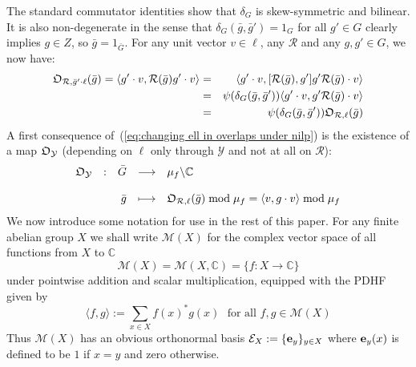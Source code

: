 \documentclass[12pt]{article}
\newcommand{\addwords}[1]{\ \ \ \mbox{#1}}
\newcommand{\bbC}{\ensuremath{\mathbb{C}}}\newcommand{\bbCp}{\ensuremath{\mathbb{C}_p}}
\newcommand{\be}{\ensuremath{{\bf e}}}
\newcommand{\cE}{\ensuremath{\mathcal{E}}}
\newcommand{\cM}{\mathcal{M}}
\newcommand{\cR}{\ensuremath{\mathcal{R}}}
\newcommand{\cY}{\ensuremath{\mathcal{Y}}}
\newcommand{\displaymapdef}[5]
{
	\begin{array}{rcrcl}
		#1 &:& #2 &\longrightarrow& #3 \\
		& &    &                    \\
		& & #4 &\longmapsto    & #5
	\end{array}
}
\newcommand{\barg}{\ensuremath{\bar{g}}}
\newcommand{\barG}{\ensuremath{\bar{G}}}
\newcommand{\cAng}{{\frak O}}
\begin{document}
The standard commutator identities show that $\delta_G$ 
is skew-symmetric and bilinear. It is also non-degenerate in the sense that
 $\delta_G(\barg,\barg')=1_G$ for all $g'\in G$ clearly implies $g\in Z$, 
so $\barg=1_{\barG}$. For any unit vector $v\in\ell$, any $\cR$  and any $g,g'\in G$, we now have:   
\begin{eqnarray}
	\cAng_{\cR,\barg'\cdot \ell}(\barg)=
	\langle g'\cdot v,\cR(\barg)g'\cdot v\rangle&=&
	\langle g'\cdot v,[\cR(\barg),g']g'\cR(\barg)\cdot v\rangle\nonumber\\
	&=&
	\psi(\delta_G(\barg,\barg'))\langle g'\cdot v,g'\cR(\barg)\cdot v\rangle\nonumber\\
	&=&
	\psi(\delta_G(\barg,\barg'))\cAng_{\cR, \ell}(\barg)\label{eq:changing ell in overlaps under nilp}
\end{eqnarray}
A first consequence of~(\ref{eq:changing ell in overlaps under nilp}) is the existence of a map $\cAng_\cY$ (depending on $\ell$ only through $\cY$ and not at all on $\cR$):
\begin{equation}\label{eq:overlap map of bouquet}
	\displaymapdef{\cAng_\cY}{\barG}{\mu_f\backslash\bbC}{\barg}{\cAng_{\cR,\ell}(\barg) \bmod \mu_f=\langle v,g\cdot v\rangle \bmod \mu_f}
\end{equation}
We now introduce some notation for use in the rest of this paper. For any finite abelian group $X$ we shall write 
$\cM(X)$ for the  complex vector space of all functions from $X$ to $\bbC$
$$
\cM(X)=\cM(X,\bbC)=\{f:X\longrightarrow \bbC\}
$$
under pointwise addition and scalar multiplication, 
equipped with the PDHF given by 
\begin{equation}\label{eq:PDHF on M(A)}
	\langle f, g \rangle:=\sum_{x\in X}f(x)^\ast g(x)\addwords{for all  $f,g\in \cM(X)$}
\end{equation}  
Thus $\cM(X)$ has an obvious orthonormal basis $\cE_X:=\{\be_y\}_{y\in X}$ where 
$\be_y(x)$ is defined to be $1$ if $x=y$ and zero otherwise.  
\end{document}
